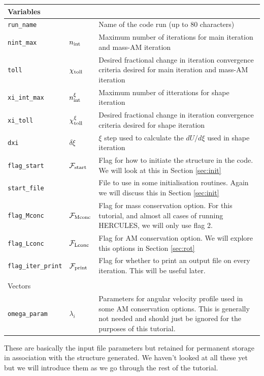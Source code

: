 \documentclass[11pt, oneside]{article}   	%
\begin{document}
\begin{longtable}{l l p{10cm}}
\multicolumn{3}{l}{Variables} \\
\hline
\texttt{run\_name} & & Name of the code run (up to 80 characters) \\
\texttt{nint\_max} & $n_{\rm int}$ & Maximum number of iterations for main iteration and mass-AM iteration \\
\texttt{toll} & $\chi_{\rm toll}$ & Desired fractional change in iteration convergence criteria desired for main iteration and mass-AM iteration \\
\texttt{xi\_int\_max} & $n_{\rm int}^{\xi}$ & Maximum number of itterations for shape iteration \\
\texttt{xi\_toll} & $\chi_{\rm toll}^{\xi}$ & Desired fractional change in iteration convergence criteria desired for shape iteration \\
\texttt{dxi} & $\delta \xi$ & $\xi$ step used to calculate the $dU/d\xi$ used in shape iteration \\
\texttt{flag\_start} & $\mathcal{F}_{\rm start}$ & Flag for how to initiate the structure in the code. We will look at this in Section \ref{sec:init} \\
\texttt{start\_file} & & File to use in some initialisation routines. Again we will discuss this in Section \ref{sec:init} \\
\texttt{flag\_Mconc} & $\mathcal{F}_{\rm Mconc}$ & Flag for mass conservation option. For this tutorial, and almost all cases of running HERCULES, we will only use flag 2. \\
\texttt{flag\_Lconc} & $\mathcal{F}_{\rm Lconc}$ & Flag for AM conservation option. We will explore this options in Section \ref{sec:rot} \\
\texttt{flag\_iter\_print} & $\mathcal{F}_{\rm print}$ & Flag for whether to print an output file on every iteration. This will be useful later. \\

\multicolumn{3}{l}{} \\
\multicolumn{3}{l}{Vectors} \\
\hline
\texttt{omega\_param} & $\lambda_i$ & Parameters for angular velocity profile used in some AM conservation options. This is generally not needed and should just be ignored for the purposes of this tutorial. \\

\end{longtable}
\vspace{0.5 cm}

These are basically the input file parameters but retained for permanent storage in association with the structure generated. We haven't looked at all these yet but we will introduce them as we go through the rest of the tutorial. 
\end{document}
